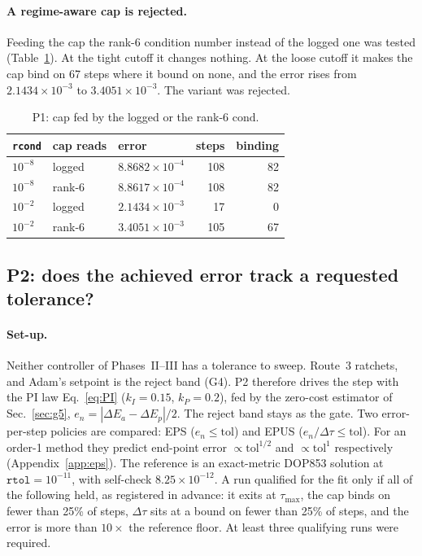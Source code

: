 \documentclass[aps,pra,reprint,superscriptaddress,nofootinbib]{revtex4-2}
\newcommand{\dt}{\Delta\tau}
\newcommand{\cond}{\mathrm{cond}}
\newcommand{\rcond}{\texttt{rcond}}
\newcommand{\tol}{\mathrm{tol}}
\begin{document}
\paragraph*{A regime-aware cap is rejected.} Feeding the cap the rank-6 condition number
instead of the logged one was tested (Table~\ref{tab:p1cap}). At the tight cutoff it changes
nothing. At the loose cutoff it makes the cap bind on 67 steps where it bound on none, and
the error rises from $2.1434\times10^{-3}$ to $3.4051\times10^{-3}$. The variant was rejected.

\begin{table}[t]
\caption{P1: cap fed by the logged or the rank-6 $\cond$.}
\label{tab:p1cap}
\begin{ruledtabular}
\begin{tabular}{lllrr}
\rcond & cap reads & error & steps & binding \\
\midrule
$10^{-8}$ & logged & $8.8682\times10^{-4}$ & 108 & 82 \\
$10^{-8}$ & rank-6 & $8.8617\times10^{-4}$ & 108 & 82 \\
$10^{-2}$ & logged & $2.1434\times10^{-3}$ & 17  & 0 \\
$10^{-2}$ & rank-6 & $3.4051\times10^{-3}$ & 105 & 67 \\
\end{tabular}
\end{ruledtabular}
\end{table}

\subsection{P2: does the achieved error track a requested tolerance?}

\paragraph*{Set-up.} Neither controller of Phases~II--III has a tolerance to sweep. Route~3
ratchets, and Adam's setpoint is the reject band (G4). P2 therefore drives the step with the
PI law Eq.~\eqref{eq:PI} ($k_I=0.15$, $k_P=0.2$), fed by the zero-cost estimator of
Sec.~\ref{sec:g5}, $e_n=|\Delta E_a-\Delta E_p|/2$. The reject band stays as the gate. Two
error-per-step policies are compared: EPS ($e_n\le\tol$) and EPUS ($e_n/\dt\le\tol$). For an
order-1 method they predict end-point error $\propto\tol^{1/2}$ and $\propto\tol^{1}$
respectively (Appendix~\ref{app:eps}). The reference is an exact-metric DOP853 solution at
$\texttt{rtol}=10^{-11}$, with self-check $8.25\times10^{-12}$. A run qualified for the fit
only if all of the following held, as registered in advance: it exits at $\tau_{\max}$, the
cap binds on fewer than 25\% of steps, $\dt$ sits at a bound on fewer than 25\% of steps, and
the error is more than $10\times$ the reference floor. At least three qualifying runs were
required.
\end{document}
